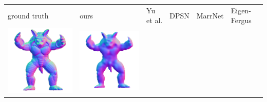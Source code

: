 \begin{tabularx}{\linewidth}{@{}Y@{}Y@{}Y@{}Y@{}Y@{}Y@{}}
ground truth & ours & Yu et al. & DPSN & MarrNet & Eigen-Fergus \\
\includegraphics[width=\linewidth]{semisynthetic/20150514_22_gt.png} &
\includegraphics[width=\linewidth]{semisynthetic/20150514_22_ours_out.png} &

\end{tabularx}
